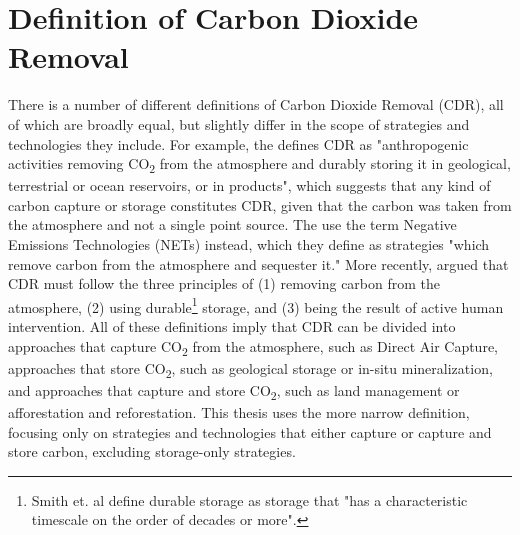 \section{Definition of Carbon Dioxide Removal}
There is a number of different definitions of Carbon Dioxide Removal (CDR), all of which are broadly equal, but slightly differ in the scope of strategies and technologies they include. For example, the \textcite[544]{IPCC2018Global1.5C} defines CDR as "anthropogenic activities removing CO\textsubscript{2} from the atmosphere and durably storing it in geological, terrestrial or ocean reservoirs, or in products", which suggests that any kind of carbon capture or storage constitutes CDR, given that the carbon was taken from the atmosphere and not a single point source. The \textcite[1]{NationalAcademiesofSciences2018NegativeAgenda} use the term Negative Emissions Technologies (NETs) instead, which they define as strategies "which remove carbon from the atmosphere and sequester it." More recently, \textcite[11]{Smith2023TheEdition} argued that CDR must follow the three principles of (1) removing carbon from the atmosphere, (2) using durable\footnote{ Smith et. al define durable storage as storage that "has a characteristic timescale on the order of decades or more".} storage, and (3) being the result of active human intervention. All of these definitions imply that CDR can be divided into approaches that capture CO\textsubscript{2} from the atmosphere, such as Direct Air Capture, approaches that store CO\textsubscript{2}, such as geological storage or in-situ mineralization, and approaches that capture and store CO\textsubscript{2}, such as land management or afforestation and reforestation. This thesis uses the more narrow definition, focusing only on strategies and technologies that either capture or capture and store carbon, excluding storage-only strategies.
